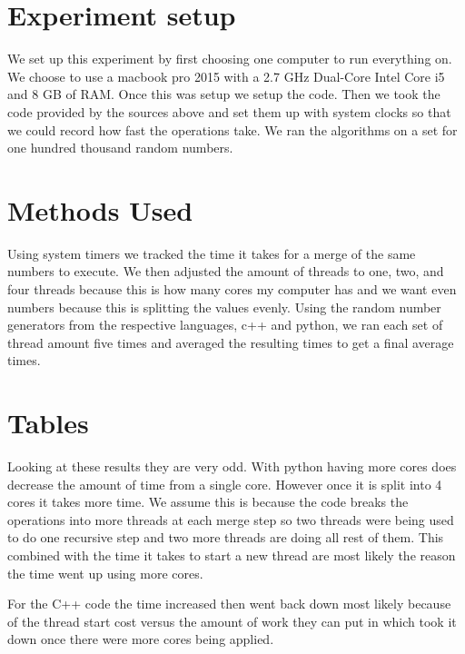 \documentclass{article}
\begin{document}
\section{Experiment setup}

We set up this experiment by first choosing one computer to run everything on. We choose to use a macbook pro 2015 with a 2.7 GHz Dual-Core Intel Core i5 and 8 GB of RAM. Once this was setup we setup the code.  Then we took the code provided by the sources above and set them up with system clocks so that we could record how fast the operations take. We ran the algorithms on a set for one hundred thousand random numbers.

\section{Methods Used}

Using system timers we tracked the time it takes for a merge of the same numbers to execute. We then adjusted the amount of threads to one, two, and four threads because this is how many cores my computer has and we want even numbers because this is splitting the values evenly. Using the random number generators from the respective languages, c++ and python, we ran each set of thread amount five times and averaged the resulting times to get a final average times. 

\section{Tables}


Looking at these results they are very odd. With python having more cores does decrease the amount of time from a single core. However once it is split into 4 cores it takes more time. We assume this is because the code breaks the operations into more threads at each merge step so two threads were being used to do one recursive step and two more threads are doing all rest of them. This combined with the time it takes to start a new thread are most likely the reason the time went up using more cores. \newline

For the C++ code the time increased then went back down most likely because of the thread start cost versus the amount of work they can put in which took it down once there were more cores being applied. 
\end{document}
